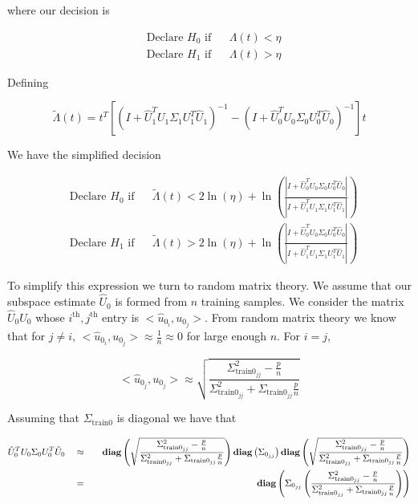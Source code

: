 \documentclass[english]{article}
\begin{document}
where our decision is

\begin{equation}
\begin{aligned}
&\text{Declare } H_0 \text{ if}
&& \Lambda(t) < \eta\\
& \text{Declare } H_1 \text{ if}
&& \Lambda(t) > \eta
\end{aligned}
\end{equation}

Defining

\begin{equation}\label{eq:stoch LRT}
\tilde{\Lambda}(t) = t^T\left[\left(I+\hat{U}_1^TU_1\Sigma_1U_1^T\hat{U}_1\right)^{-1}-\left(I+\hat{U}_0^TU_0\Sigma_0U_0^T\hat{U}_0\right)^{-1}\right]t
\end{equation}

We have the simplified decision

\begin{equation}\label{eq:stoch dec}
\begin{aligned}
&\text{Declare } H_0 \text{ if}
&& \tilde{\Lambda}(t) < 2\ln(\eta)+\ln\left(\frac{|I+\hat{U}_0^TU_0\Sigma_0U_0^T\hat{U}_0|}{|I+\hat{U}_1^TU_1\Sigma_1U_1^T\hat{U}_1|}\right)\\
& \text{Declare } H_1 \text{ if}
&& \tilde{\Lambda}(t) > 2\ln(\eta) +\ln\left(\frac{|I+\hat{U}_0^TU_0\Sigma_0U_0^T\hat{U}_0|}{|I+\hat{U}_1^TU_1\Sigma_1U_1^T\hat{U}_1|}\right)
\end{aligned}
\end{equation}

To simplify this expression we turn to random matrix theory. We assume that our subspace estimate $\hat{U}_0$ is formed from $n$ training samples. We consider the matrix $\hat{U}_0U_0$ whose $i^{\text{th}}, j^{\text{th}}$ entry is $<\hat{u}_{0_i}, u_{0_j}>$. From random matrix theory we know that for $j\neq i$, $<\hat{u}_{0_i}, u_{0_j}>\approx \frac{1}{n}\approx 0$ for large enough $n$. For $i=j$,

$$<\hat{u}_{0_j}, u_{0_j}>\approx\sqrt{\frac{\Sigma_{\text{train}0_{jj}}^2-\frac{p}{n}}{\Sigma_{\text{train}0_{jj}}^2+\Sigma_{\text{train}0_{jj}}\frac{p}{n}}}$$

Assuming that $\Sigma_{\text{train}0}$ is diagonal we have that

\begin{equation}
\begin{aligned}
&\hat{U}_0^TU_0\Sigma_0U_0^T\hat{U}_0
&&\approx
&&&\mathop{\bf diag}\left(\sqrt{\frac{\Sigma_{\text{train}0_{jj}}^2-\frac{p}{n}}{\Sigma_{\text{train}0_{jj}}^2+\Sigma_{\text{train}0_{jj}}\frac{p}{n}}}\right)\mathop{\bf diag}\left(\Sigma_{0_{jj}}\right)\mathop{\bf diag}\left(\sqrt{\frac{\Sigma_{\text{train}0_{jj}}^2-\frac{p}{n}}{\Sigma_{\text{train}0_{jj}}^2+\Sigma_{\text{train}0_{jj}}\frac{p}{n}}}\right)\\
&&&=
&&&\mathop{\bf diag}\left(\Sigma_{0_{jj}}\left(\frac{\Sigma_{\text{train}0_{jj}}^2-\frac{p}{n}}{\Sigma_{\text{train}0_{jj}}^2+\Sigma_{\text{train}0_{jj}}\frac{p}{n}}\right)\right)\\
\end{aligned}
\end{equation}
\end{document}
